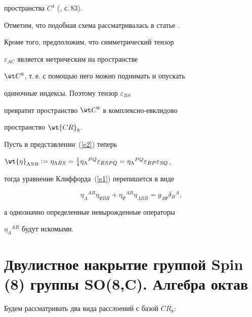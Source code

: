 пространства $C^4$ (\cite{Penrose1}, с.\,83).


Отметим, что подобная схема рассматривалась в статье \cite{Shirok1}.


Кроме того, предположим, что симметрический тензор


$\varepsilon_{AC}$ является метрическим на пространстве


$\wt C^8$, т.\,е. с помощью него можно поднимать и опускать


одиночные индексы. Поэтому тензор $\varepsilon_{BS}$


превратит пространство $\wt C^8$ в комплексно-евклидово


пространство $\wt {CR}_8$.


Пусть в представлении~(\ref{e2}) теперь 




$\wt{\eta}_{\Lambda SB}:=\eta_{\Lambda BS}=


\frac{1}{4}\eta_\Lambda{}^{PQ}\varepsilon_{BSPQ}=


\eta_\Lambda{}^{PQ}\varepsilon_{BP}\varepsilon_{SQ}$,




тогда уравнение Клиффорда~(\ref{e1}) перепишется в виде


\begin{equation}


\label{e3}


\eta_\Lambda{}^{AR}\eta_{\Psi BR}+\eta_\Psi{}^{AR}\eta_{\Lambda BR}=


g_{\Lambda\Psi}\delta_B{}^A,


\end{equation}


а однозначно определенные невырожденные операторы


$\eta_\Lambda{}^{AR}$ будут искомыми.





\section{Двулистное накрытие группой Spin\,(8) группы SO(8,C). Алгебра октав}





Будем рассматривать два вида расслоений с базой $CR_8$:





